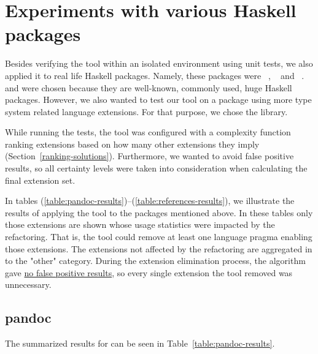 \documentclass[main.tex]{subfiles}
\begin{document}
	
	\section{Experiments with various Haskell packages}
	
	Besides verifying the tool within an isolated environment using unit tests, we also applied it to real life Haskell packages. Namely, these packages were ~\cite{pandoc}, ~\cite{http-client} and ~\cite{references-bib}.  and  were chosen because they are well-known, commonly used, huge Haskell packages. However, we also wanted to test our tool on a package using more type system related language extensions. For that purpose, we chose the  library.
	
	While running the tests, the tool was configured with a complexity function ranking extensions based on how many other extensions they imply (Section~\ref{ranking-solutions}). Furthermore, we wanted to avoid false positive results, so all certainty levels were taken into consideration when calculating the final extension set.
	
	In tables (\ref{table:pandoc-results})--(\ref{table:references-results}), we illustrate the results of applying the tool to the packages mentioned above. In these tables only those extensions are shown whose usage statistics were impacted by the refactoring. That is, the tool could remove at least one language pragma enabling those extensions. The extensions not affected by the refactoring are aggregated in to the "other" category. During the extension elimination process, the algorithm gave \underline{no false positive results}, so every single extension the tool removed was unnecessary.
	
	\newpage
	
	\subsection{pandoc}
	
	The summarized results for  can be seen in Table~\ref{table:pandoc-results}.
				
\end{document}
